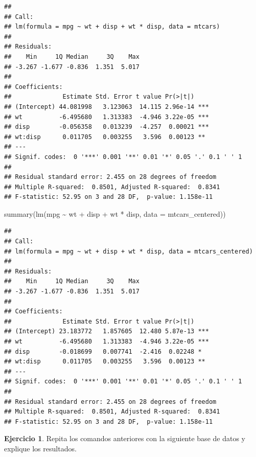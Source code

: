 \documentclass[
  12pt,
]{book}
\newenvironment{Shaded}{\begin{snugshade}}{\end{snugshade}}
\newcommand{\AttributeTok}[1]{\textcolor[rgb]{0.77,0.63,0.00}{#1}}
\newcommand{\FunctionTok}[1]{\textcolor[rgb]{0.00,0.00,0.00}{#1}}
\newcommand{\NormalTok}[1]{#1}
\newcommand{\SpecialCharTok}[1]{\textcolor[rgb]{0.00,0.00,0.00}{#1}}
\theoremstyle{definition}
\theoremstyle{definition}
\theoremstyle{definition}
\newtheorem{exercise}{Ejercicio}[chapter]
\theoremstyle{definition}
\theoremstyle{remark}
\begin{document}
\begin{verbatim}
## 
## Call:
## lm(formula = mpg ~ wt + disp + wt * disp, data = mtcars)
## 
## Residuals:
##    Min     1Q Median     3Q    Max 
## -3.267 -1.677 -0.836  1.351  5.017 
## 
## Coefficients:
##              Estimate Std. Error t value Pr(>|t|)    
## (Intercept) 44.081998   3.123063  14.115 2.96e-14 ***
## wt          -6.495680   1.313383  -4.946 3.22e-05 ***
## disp        -0.056358   0.013239  -4.257  0.00021 ***
## wt:disp      0.011705   0.003255   3.596  0.00123 ** 
## ---
## Signif. codes:  0 '***' 0.001 '**' 0.01 '*' 0.05 '.' 0.1 ' ' 1
## 
## Residual standard error: 2.455 on 28 degrees of freedom
## Multiple R-squared:  0.8501, Adjusted R-squared:  0.8341 
## F-statistic: 52.95 on 3 and 28 DF,  p-value: 1.158e-11
\end{verbatim}

\begin{Shaded}
\begin{Highlighting}[]
\FunctionTok{summary}\NormalTok{(}\FunctionTok{lm}\NormalTok{(mpg }\SpecialCharTok{\textasciitilde{}}\NormalTok{ wt }\SpecialCharTok{+}\NormalTok{ disp }\SpecialCharTok{+}\NormalTok{ wt }\SpecialCharTok{*}\NormalTok{ disp, }\AttributeTok{data =}\NormalTok{ mtcars\_centered))}
\end{Highlighting}
\end{Shaded}

\begin{verbatim}
## 
## Call:
## lm(formula = mpg ~ wt + disp + wt * disp, data = mtcars_centered)
## 
## Residuals:
##    Min     1Q Median     3Q    Max 
## -3.267 -1.677 -0.836  1.351  5.017 
## 
## Coefficients:
##              Estimate Std. Error t value Pr(>|t|)    
## (Intercept) 23.183772   1.857605  12.480 5.87e-13 ***
## wt          -6.495680   1.313383  -4.946 3.22e-05 ***
## disp        -0.018699   0.007741  -2.416  0.02248 *  
## wt:disp      0.011705   0.003255   3.596  0.00123 ** 
## ---
## Signif. codes:  0 '***' 0.001 '**' 0.01 '*' 0.05 '.' 0.1 ' ' 1
## 
## Residual standard error: 2.455 on 28 degrees of freedom
## Multiple R-squared:  0.8501, Adjusted R-squared:  0.8341 
## F-statistic: 52.95 on 3 and 28 DF,  p-value: 1.158e-11
\end{verbatim}

\begin{exercise}
\protect\hypertarget{exr:unnamed-chunk-137}{}\label{exr:unnamed-chunk-137}Repita los comandos anteriores con la siguiente base de datos y explique los resultados.
\end{exercise}
\end{document}
